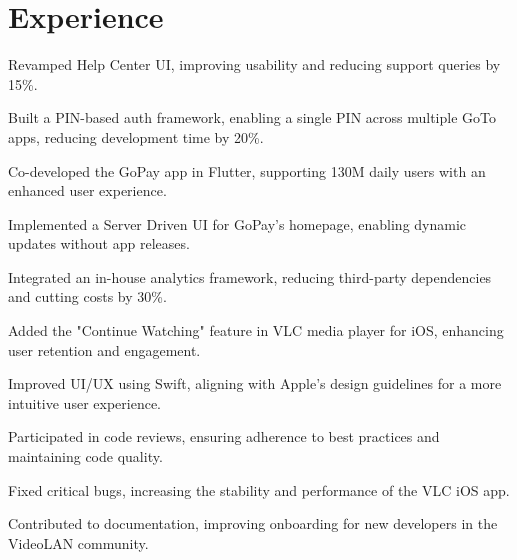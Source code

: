 \documentclass[]{deedy-resume-openfont}
\begin{document}
\begin{minipage}[t]{0.98\textwidth}
\section{Experience}
\textbf{\href{https://www.gojek.io/}{}} 
\vspace{\topsep} %
\begin{tightemize}
    \item Revamped Help Center UI, improving usability and reducing support queries by 15\%.
    \item Built a PIN-based auth framework, enabling a single PIN across multiple GoTo apps, reducing development time by 20\%.
    \item Co-developed the GoPay app in Flutter, supporting 130M daily users with an enhanced user experience.
    \item Implemented a Server Driven UI for GoPay's homepage, enabling dynamic updates without app releases.
    \item Integrated an in-house analytics framework, reducing third-party dependencies and cutting costs by 30\%.
\end{tightemize}
\sectionsep

\textbf{\href{https://summerofcode.withgoogle.com/projects/6623823417311232}{}} 
\begin{tightemize}
    \item Added the "Continue Watching" feature in VLC media player for iOS, enhancing user retention and engagement.
    \item Improved UI/UX using Swift, aligning with Apple's design guidelines for a more intuitive user experience.
    \item Participated in code reviews, ensuring adherence to best practices and maintaining code quality.
    \item Fixed critical bugs, increasing the stability and performance of the VLC iOS app.
    \item Contributed to documentation, improving onboarding for new developers in the VideoLAN community.
\end{tightemize}
\sectionsep



\end{minipage}
\end{document}
